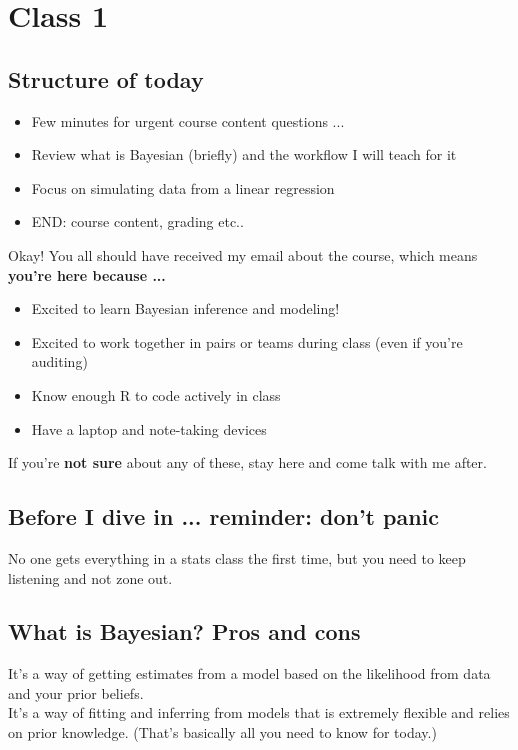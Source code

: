 \documentclass[11pt]{article}
\begin{document}

\renewcommand{\refname}{\CHead{}}

\section{Class 1} 

\subsection{Structure of today}
\begin{itemize}
\item Few minutes for urgent course content questions ... 
\item Review what is Bayesian (briefly) and the workflow I will teach for it
\item Focus on simulating data from a linear regression
\item END: course content, grading etc..
\end{itemize}
Okay! You all should have received my email about the course, which means\\ {\bf you're here because ... }
\begin{itemize}
\item Excited to learn Bayesian inference and modeling!
\item Excited to work together in pairs or teams during class (even if you're auditing)
\item Know enough R to code actively in class 
\item Have a laptop and note-taking devices
\end{itemize}
If you're {\bf not sure} about any of these, stay here and come talk with me after. 

\subsection{Before I dive in ... reminder: don't panic} %
No one gets everything in a stats class the first time, but you need to keep listening and not zone out.

\subsection{What is Bayesian? Pros and cons}
It's a way of getting estimates from a model based on the likelihood from data and your prior beliefs.\\
It's a way of fitting and inferring from models that is extremely flexible and relies on prior knowledge. (That's basically all you need to know for today.)\\
\end{document}
